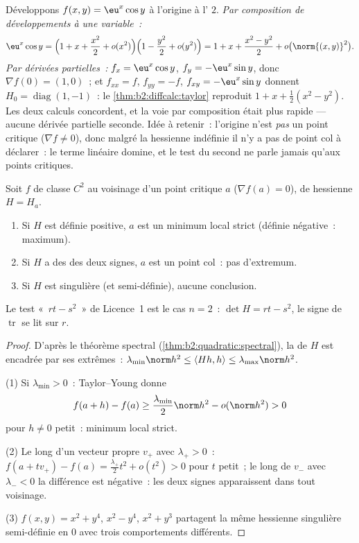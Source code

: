\begin{example}\label{ex:b2:diffcalc:taylortwoways}
Développons $f(x, y) = \eu^x\cos y$ à l'origine à l' $2$.
\emph{Par composition de développements à une variable~:}
\[
\eu^x\cos y = \Bigl(1 + x + \frac{x^2}{2} +
o(x^2)\Bigr)\Bigl(1 - \frac{y^2}{2} + o(y^2)\Bigr)
= 1 + x + \frac{x^2 - y^2}{2} + o\bigl(\norm{(x,y)}^2\bigr) .
\]
\emph{Par dérivées partielles~:} $f_x = \eu^x\cos y$, $f_y =
-\eu^x\sin y$, donc $\nabla f(0) = (1, 0)$~; et $f_{xx} = f$,
$f_{yy} = -f$, $f_{xy} = -\eu^x\sin y$ donnent $H_0 =
\operatorname{diag}(1, -1)$~: le \cref{thm:b2:diffcalc:taylor}
reproduit $1 + x + \frac12(x^2 - y^2)$. Les deux calculs concordent,
et la voie par composition était plus rapide --- aucune dérivée
partielle seconde. Idée à retenir~: l'origine n'est \emph{pas} un
point critique ($\nabla f \neq 0$), donc malgré la hessienne
indéfinie il n'y a pas de point col à déclarer~: le terme linéaire
domine, et le test du second  ne parle jamais qu'aux points
critiques.
\end{example}

\begin{theorem}\label{thm:b2:diffcalc:extrema}
Soit $f$ de classe $C^2$ au voisinage d'un point critique $a$
($\nabla f(a) = 0$), de hessienne $H = H_a$.
\begin{enumerate}
  \item Si $H$ est définie positive, $a$ est un minimum local strict
        (définie négative~: maximum).
  \item Si $H$ a des  des deux signes, $a$ est un
        point col~: pas d'extremum.
  \item Si $H$ est singulière (et semi-définie), aucune conclusion.
\end{enumerate}
Le test «~$rt - s^2$~» de Licence~1 est le cas $n = 2$~: $\det H = rt
- s^2$, le signe de $\operatorname{tr}$ se lit sur $r$.
\end{theorem}

\begin{proof}
D'après le théorème spectral (\cref{thm:b2:quadratic:spectral}), la
 de $H$ est encadrée par ses 
extrêmes~: $\lambda_{\min}\norm h^2 \leq \langle Hh, h\rangle \leq
\lambda_{\max}\norm h^2$.

(1) Si $\lambda_{\min} > 0$~: Taylor--Young donne
\[
f(a + h) - f(a) \geq \frac{\lambda_{\min}}{2}\norm h^2 -
o(\norm h^2) > 0
\]
pour $h \neq 0$ petit~: minimum local strict.

(2) Le long d'un vecteur propre $v_+$ avec $\lambda_+ > 0$~: $f(a +
tv_+) - f(a) = \frac{\lambda_+}{2}t^2 + o(t^2) > 0$ pour $t$ petit~;
le long de $v_-$ avec $\lambda_- < 0$ la différence est négative~:
les deux signes apparaissent dans tout voisinage.

(3) $f(x,y) = x^2 + y^4$, $x^2 - y^4$, $x^2 + y^3$ partagent la même
hessienne singulière semi-définie en $0$ avec trois comportements
différents.
\end{proof}


